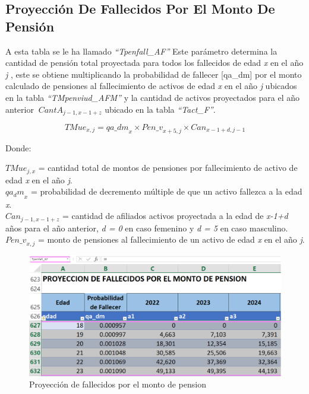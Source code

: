 \documentclass[
  letterpaper,
  DIV=11,
  numbers=noendperiod]{scrreprt}
\begin{document}
\hypertarget{proyecciuxf3n-de-fallecidos-por-el-monto-de-pensiuxf3n}{%
\subsection{Proyección De Fallecidos Por El Monto De
Pensión}\label{proyecciuxf3n-de-fallecidos-por-el-monto-de-pensiuxf3n}}

A esta tabla se le ha llamado \emph{``Tpenfall\_AF''} Este parámetro
determina la cantidad de pensión total proyectada para todos los
fallecidos de edad \emph{x} en el año \emph{j} , este se obtiene
multiplicando la probabilidad de fallecer {[}qa\_dm{]} por el monto
calculado de pensiones al fallecimiento de activos de edad \emph{x} en
el año \emph{j} ubicados en la tabla \emph{``TMpenviud\_AFM''} y la
cantidad de activos proyectados para el año anterior
\({\ CantA}_{j-1,x-1+z}\) ubicado en la tabla \emph{``Tact\_F''}.

\begin{equation}
{TMue}_{x,j}={qa\_dm}_x\times{Pen\_v}_{x+5,j}\times{Can}_{x-1+d,j-1}
\end{equation}

Donde:

\({TMue}_{j,x}\) = cantidad total de montos de pensiones por
fallecimiento de activo de edad \emph{x} en el año \emph{j}.\\
\({qa_dm}_x\) = probabilidad de decremento múltiple de que un activo
fallezca a la edad \emph{x}.\\
\(Can_{j-1,x-1+z}\) = cantidad de afiliados activos proyectada a la edad
de \emph{x-1+d} años para el año anterior, \emph{d = 0} en caso femenino
y \emph{d = 5} en caso masculino.\\
\({Pen\_v}_{x,j}\) = monto de pensiones al fallecimiento de un activo de
edad \emph{x} en el año \emph{j}.

\begin{figure}

{\centering \includegraphics{images/F/Img21.png}

}

\caption{Proyección de fallecidos por el monto de pension}

\end{figure}
\end{document}
